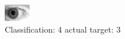 \begin{figure}[h!]
\begin{center}
\includegraphics[width=0.60\columnwidth]{figures/ID251_class_4_target_3.png}
\end{center}
\caption{ Classification: 4 actual target: 3}
\label{fig:ID251_class_4_target_3}
\end{figure}
